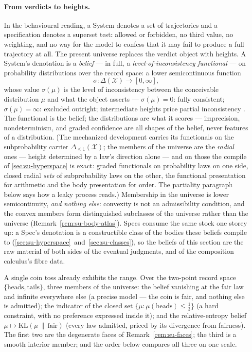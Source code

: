 \paragraph{From verdicts to heights.} In the behavioural reading, a
System denotes a set of trajectories and a specification denotes a
superset test: allowed or forbidden, no third value, no weighting,
and no way for the model to confess that it may fail to produce a
full trajectory at all. The present universe replaces the verdict
object with heights. A System's denotation is a \emph{belief} --- in
full, a \emph{level-of-inconsistency functional} --- on probability
distributions over the record space: a lower semicontinuous function
\[
  \sigma \colon \Delta(\mathcal{X}) \longrightarrow
  [0, \infty],
\]
whose value $\sigma(\mu)$ is the level of inconsistency between the
conceivable distribution $\mu$ and what the object asserts ---
$\sigma(\mu) = 0$: fully consistent;
$\sigma(\mu) = \infty$: excluded outright; intermediate heights price
partial inconsistency \cite{richardson20, dalrymple26imprecise}. The
functional is the belief; the
distributions are what it scores --- imprecision, nondeterminism,
and graded confidence are all shapes of the belief, never
features of a distribution. (The mechanized development carries its
functionals on the subprobability carrier $\Delta_{\le 1}(\mathcal{X})$; the
members of the universe are the \emph{radial} ones --- height determined by
a law's direction alone --- and on those the compile of
\autoref{sec:su-hyperspace} is exact: graded functionals on probability
laws on one side, closed radial \emph{sets} of subprobability laws on the
other, the functional presentation for arithmetic and the body presentation
for order. The partiality paragraph below says how a leaky process reads.)
Membership in the universe is lower
semicontinuity, \emph{and nothing else}: convexity is not an
admissibility condition, and the convex members form distinguished
subclasses of the universe rather than the universe
(Remark~\ref{rem:su-body-atlas}). Specs consume the same stock one
storey up: a Spec's denotation is a constructible class of the
bodies these beliefs compile to
(\autoref{sec:su-hyperspace}~and~\autoref{sec:su-classes}), so the
beliefs of this section are the raw material of both sides of the
eventual judgments, and of the composition calculus's fibre data.

A single coin toss already exhibits the range. Over the two-point
record space $\{\mathrm{heads}, \mathrm{tails}\}$, three members of
the universe: the belief vanishing at the fair law and infinite
everywhere else (a precise model --- the coin is fair, and nothing
else is admitted); the indicator of the closed set
$\{\mu : \mu(\mathrm{heads}) \le \tfrac13\}$ (a hard constraint,
with no preference expressed inside it); and the relative-entropy
belief $\mu \mapsto \mathrm{KL}(\mu \,\|\, \mathrm{fair})$ (every
law admitted, priced by its divergence from fairness). The first
two are the degenerate faces of Remark~\ref{rem:su-faces}; the
third is a smooth interior member; and the order below compares
all three on one scale.

